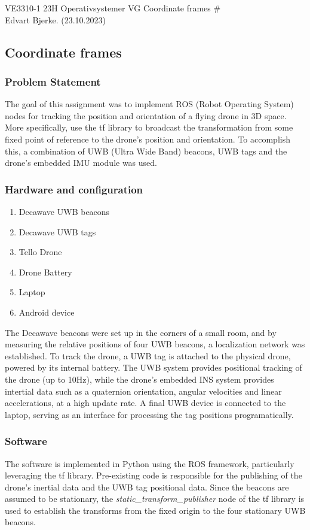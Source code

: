 \documentclass[12pt]{article}
\begin{document}
\noindent VE3310-1 23H Operativsystemer VG \hfill Coordinate frames \#\\
Edvart Bjerke. (23.10.2023)

\hrulefill

\subsection*{Coordinate frames}
\subsubsection*{Problem Statement}

The goal of this assignment was to implement ROS (Robot Operating System) nodes 
for tracking the position and orientation of a flying drone in 3D space. More specifically, use the tf 
library to broadcast the transformation from some fixed point of reference to the drone's position and orientation.
To accomplish this, a combination of UWB (Ultra Wide Band) beacons, UWB tags and the drone's embedded IMU module was used.

\subsubsection*{Hardware and configuration}
\begin{enumerate}
    \item Decawave UWB beacons
    \item Decawave UWB tags
    \item Tello Drone
    \item Drone Battery
    \item Laptop
    \item Android device
\end{enumerate}

The Decawave beacons were set up in the corners of a small room, and by measuring the relative positions of four UWB beacons, a localization network was established. To track the drone, a UWB tag is attached to the physical drone, powered by its internal battery.
The UWB system provides positional tracking of the drone (up to 10Hz), while the drone's embedded INS system provides intertial data such as a quaternion orientation, angular velocities and linear accelerations, at a high update rate.
A final UWB device is connected to the laptop, serving as an interface for processing the tag positions programatically.

\subsubsection*{Software}
The software is implemented in Python using the ROS framework, particularly leveraging the tf library. Pre-existing code is responsible for the publishing of the drone's inertial data and the UWB tag positional data.
Since the beacons are assumed to be stationary, the \textit{static\_transform\_publisher} node of the tf library is used to establish the transforms from the fixed origin to the four stationary UWB beacons. 
\\
\end{document}
